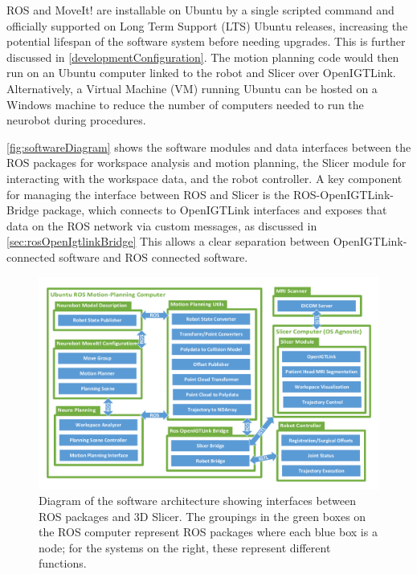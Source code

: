 \documentclass[12pt]{report}
\begin{document}
ROS and MoveIt! are installable on Ubuntu by a single scripted command and officially supported on Long Term Support (LTS) Ubuntu releases, increasing the potential lifespan of the software system before needing upgrades. This is further discussed in \autoref{developmentConfiguration}. The motion planning code would then run on an Ubuntu computer linked to the robot and Slicer over OpenIGTLink. Alternatively, a Virtual Machine (VM) running Ubuntu can be hosted on a Windows machine to reduce the number of computers needed to run the neurobot during procedures.

\autoref{fig:softwareDiagram} shows the software modules and data interfaces between the ROS packages for workspace analysis and motion planning, the Slicer module for interacting with the workspace data, and the robot controller. A key component for managing the interface between ROS and Slicer is the ROS-OpenIGTLink-Bridge package, which connects to OpenIGTLink interfaces and exposes that data on the ROS network via custom messages, as discussed in \autoref{sec:rosOpenIgtlinkBridge} This allows a clear separation between OpenIGTLink-connected software and ROS connected software.

\begin{figure}[thpb]
	\centering
	\includegraphics[width=\textwidth]{diagrams/Software_Diagrams_Simplified.pdf}
    \caption{Diagram of the software architecture showing interfaces between ROS packages and 3D Slicer. The groupings in the green boxes on the ROS computer represent ROS packages where each blue box is a node; for the systems on the right, these represent different functions. }
    \label{fig:softwareDiagram}
\end{figure}


\end{document}
